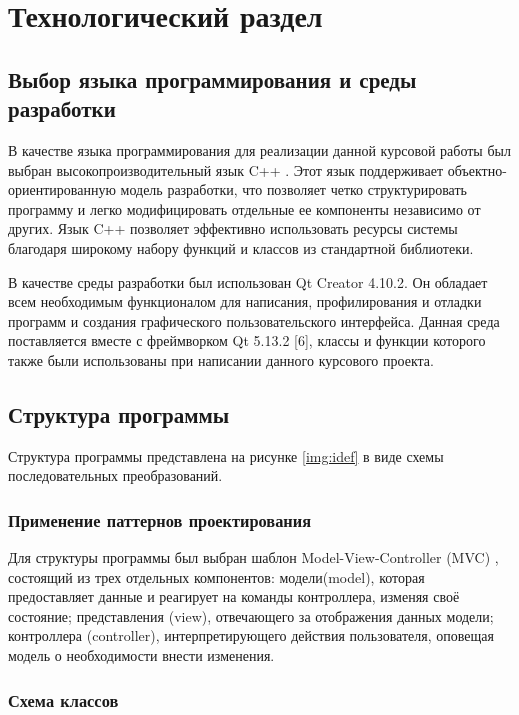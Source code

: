 \chapter{Технологический раздел}

\section{Выбор языка программирования и среды разработки}

В качестве языка программирования для реализации данной курсовой работы был выбран высокопроизводительный язык C++ \cite{cpp17}.
Этот язык поддерживает объектно-ориентированную модель разработки, что позволяет четко структурировать программу и легко модифицировать отдельные ее компоненты независимо от других.
Язык C++ позволяет эффективно использовать ресурсы системы благодаря широкому набору функций и классов из стандартной библиотеки.

В качестве среды разработки был использован Qt Creator 4.10.2.
Он обладает всем необходимым функционалом для написания, профилирования и отладки программ и создания графического пользовательского интерфейса. Данная среда поставляется вместе с фреймворком Qt 5.13.2 [6], классы и функции которого также были использованы при написании данного курсового проекта.

\section{Структура программы}

Структура  программы  представлена  на  рисунке \ref{img:idef} в виде схемы последовательных преобразований.


\subsection{Применение паттернов проектирования}

Для структуры программы был выбран шаблон Model-View-Controller (MVC) \cite{Gamma}, состоящий из трех отдельных компонентов: модели(model), которая предоставляет  данные  и  реагирует  на  команды контроллера, изменяя своё состояние; представления (view), отвечающего за отображения данных модели; контроллера (controller), интерпретирующего действия пользователя, оповещая модель о необходимости внести изменения.

\subsection{Схема классов}

